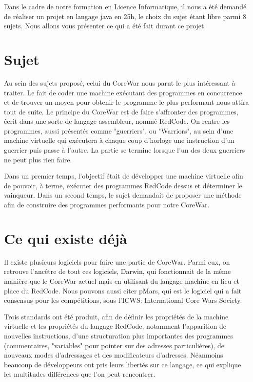 \documentclass[hidelinks]{report}
\begin{document}
Dans le cadre de notre formation en Licence Informatique, il nous a été demandé de réaliser un projet en langage java en 25h, le choix du sujet étant libre parmi 8 sujets. Nous allons vous présenter ce qui a été fait durant ce projet.

\section{Sujet}
Au sein des sujets proposé, celui du CoreWar nous parut le plus intéressant à traiter. Le fait de coder une machine exécutant des programmes en concurrence et de trouver un moyen pour obtenir le programme le plus performant nous attira tout de suite.
Le principe du CoreWar est de faire s'affronter des programmes, écrit dans une sorte de langage assembleur, nommé RedCode. On rentre les programmes, aussi présentés comme "guerriers", ou "Warriors", au sein d'une machine virtuelle qui exécutera à chaque coup d'horloge une instruction d'un guerrier puis passe à l'autre. La partie se termine lorsque l'un des deux guerriers ne peut plus rien faire.

Dans un premier temps, l'objectif était de développer une machine virtuelle afin de pouvoir, à terme, exécuter des programmes RedCode dessus et déterminer le vainqueur. Dans un second temps, le sujet demandait de proposer une méthode afin de construire des programmes performants pour notre CoreWar.
\section{Ce qui existe déjà}
Il existe plusieurs logiciels pour faire une partie de CoreWar. Parmi eux, on retrouve l'ancêtre de tout ces logiciels, Darwin, qui fonctionnait de la même manière que le CoreWar actuel mais en utilisant du langage machine en lieu et place du RedCode. Nous pouvons aussi citer pMars, qui est le logiciel qui a fait consensus pour les compétitions, sous l'ICWS: International Core Wars Society.

Trois standards ont été produit, afin de définir les propriétés de la machine virtuelle et les propriétés du langage RedCode, notamment l'apparition de nouvelles instructions, d'une structuration plus importantes des programmes (commentaires, "variables" pour pointer sur des adresses particulières), de nouveaux modes d'adressages et des modificateurs d'adresses. Néanmoins beaucoup de développeurs ont pris leurs libertés sur ce langage, ce qui explique les multitudes différences que l'on peut rencontrer.
\end{document}

